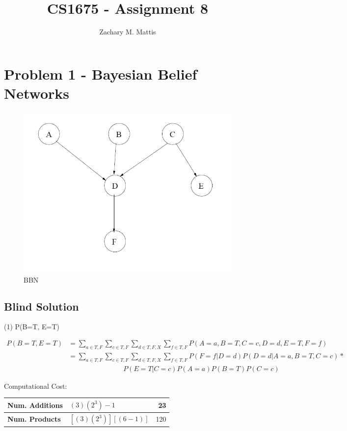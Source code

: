 \documentclass[12pt, letterpaper]{report}
\title{CS1675 - Assignment 8}
\author{Zachary M. Mattis}
\begin{document}
\maketitle

\section{Problem 1 - Bayesian Belief Networks}

\begin{figure}[H]
	\centering
	\includegraphics[width=0.4\columnwidth]{bbn.png}
	\caption{BBN}
\end{figure}

\subsection{Blind Solution}

(1) \qquad P(B=T, E=T)


\begin{equation*}
\begin{split}
P(B=T, E=T) &= \sum_{a\in T,F}\sum_{c\in T,F}\sum_{d\in T,F,X}\sum_{f\in T,F} P(A=a,B=T,C=c,D=d,E=T,F=f)\\
&= \sum_{a\in T,F}\sum_{c\in T,F}\sum_{d\in T,F,X}\sum_{f\in T,F}P(F=f|D=d)P(D=d|A=a,B=T,C=c) * \\&\qquad\qquad\qquad\qquad P(E=T|C=c)P(A=a)P(B=T)P(C=c)
\end{split}
\end{equation*}

Computational Cost:

\begin{table}[H]
	\begin{tabular}{ |l|l|r| }
		\hline
		\textbf{Num. Additions} & $(3)(2^3)-1$ & 23 \\
		\hline
		\textbf{Num. Products} & $ [(3)(2^3)][(6-1)]$ & 120 \\
		\hline
	\end{tabular}
\end{table}
\end{document}
